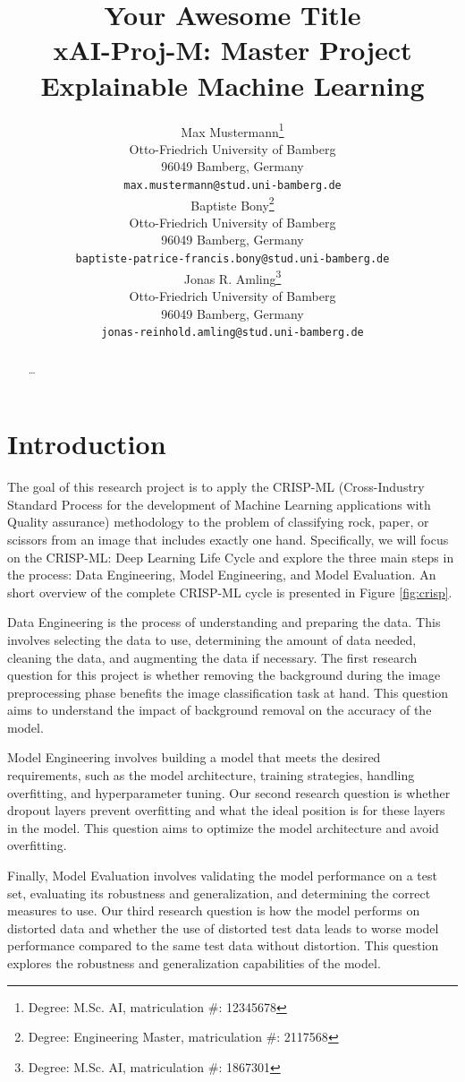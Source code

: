 \documentclass[a4paper]{article}
\title{ Your Awesome Title\\ {\large xAI-Proj-M: Master Project Explainable Machine Learning }}
\author{%
  Max Mustermann\thanks{Degree: M.Sc. AI, matriculation \#: 12345678} \\
  Otto-Friedrich University of Bamberg\\
  96049 Bamberg, Germany\\
  \texttt{max.mustermann@stud.uni-bamberg.de}\\
   \And
   Baptiste Bony\thanks{Degree: Engineering Master, matriculation \#: 2117568}\\
   Otto-Friedrich University of Bamberg\\
   96049 Bamberg, Germany\\
   \texttt{baptiste-patrice-francis.bony@stud.uni-bamberg.de} \\
   \And
   Jonas R. Amling\thanks{Degree: M.Sc. AI, matriculation \#: 1867301}\\
   Otto-Friedrich University of Bamberg\\
   96049 Bamberg, Germany\\
   \texttt{jonas-reinhold.amling@stud.uni-bamberg.de} \\
}
\begin{document}
\maketitle
\def\va{{\bm{a}}}

\begin{abstract}
  \dots
\end{abstract}


\section{Introduction}

The goal of this research project is to apply the CRISP-ML (Cross-Industry Standard Process for the development of Machine Learning applications with Quality assurance) methodology \citep{crisp} to the problem of classifying rock, paper, or scissors from an image that includes exactly one hand. Specifically, we will focus on the CRISP-ML: Deep Learning Life Cycle and explore the three main steps in the process: Data Engineering, Model Engineering, and Model Evaluation. An short overview of the complete CRISP-ML cycle is presented in Figure \ref{fig:crisp}.

Data Engineering is the process of understanding and preparing the data. This involves selecting the data to use, determining the amount of data needed, cleaning the data, and augmenting the data if necessary. The first research question for this project is whether removing the background during the image preprocessing phase benefits the image classification task at hand. This question aims to understand the impact of background removal on the accuracy of the model.

Model Engineering involves building a model that meets the desired requirements, such as the model architecture, training strategies, handling overfitting, and hyperparameter tuning. Our second research question is whether dropout layers prevent overfitting and what the ideal position is for these layers in the model. This question aims to optimize the model architecture and avoid overfitting.

Finally, Model Evaluation involves validating the model performance on a test set, evaluating its robustness and generalization, and determining the correct measures to use. Our third research question is how the model performs on distorted data and whether the use of distorted test data leads to worse model performance compared to the same test data without distortion. This question explores the robustness and generalization capabilities of the model.
\end{document}
